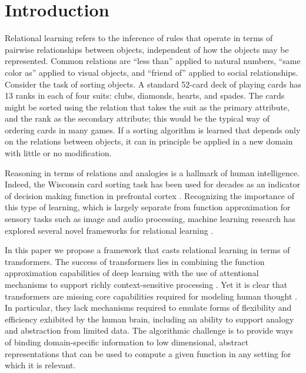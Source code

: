\section{Introduction}
\label{sec:intro}

Relational learning refers to the inference of rules that operate in terms of pairwise relationships between 
objects, independent of how the objects may be represented. Common relations are ``less than'' applied to natural numbers, ``same color as'' applied to visual objects, and ``friend of'' applied to social relationships. Consider the task of sorting objects. A standard 52-card deck of playing cards has 13 ranks in each of four suits: clubs, diamonds, hearts, and spades. The cards might be sorted using the relation that takes 
the suit as the primary attribute, and the rank as the secondary attribute; this would be the typical 
way of ordering cards in many games. If a sorting algorithm is learned that depends 
only on the relations between objects, it can in principle be applied in a new domain with little 
or no modification. 

Reasoning in terms of relations and analogies is a hallmark of human intelligence. 
Indeed, the Wisconsin card sorting task \citep{berg} has been used for decades as an indicator of decision making function in prefrontal cortex \citep{monchi}. Recognizing the importance of this type of learning, which is largely separate from function approximation for sensory tasks such as image and audio processing, machine learning research has explored several novel frameworks for relational learning \citep{TEM, NTM,episodicControl,esbn,mondal23learned,musslick2021rationalizing,battaglia,barrett:2018,santoro1} .

In this paper we propose a framework that casts relational learning in terms of transformers. 
The success of transformers lies in combining the function approximation capabilities of deep learning with the use of attentional mechanisms to support richly context-sensitive processing \citep{transformers,vaswani2017attention,kerg2020untangling}. Yet it is clear that transformers are missing core capabilities required for modeling human thought \citep{mahowald2023dissociating}.  In particular, they lack mechanisms required to emulate forms of flexibility and efficiency exhibited by the human brain, including an ability to support analogy and abstraction from limited data. The algorithmic challenge is to provide ways of binding domain-specific information to low dimensional, abstract representations that can be used to compute a given function in any setting for which it is relevant. 

